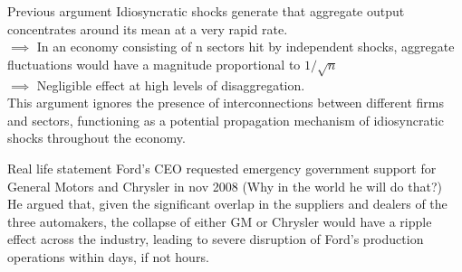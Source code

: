 \documentclass{beamer}
\begin{document}


\begin{frame}{Previous argument}
    \justifying
    Idiosyncratic shocks generate that aggregate output concentrates around its mean at a very rapid rate.\\[5pt]
    $\implies$  In an economy consisting of n sectors hit by independent shocks, aggregate fluctuations 
    would have a magnitude proportional to $1/ \sqrt{n}$\\[5pt]
    $\implies$ Negligible effect at
    high levels of disaggregation.\\[10pt]
    
    This argument ignores the presence of interconnections between
    different firms and sectors, functioning as a potential propagation mechanism
    of idiosyncratic shocks throughout the economy.\\
\end{frame}


\begin{frame}{Real life statement}
    \justifying
    Ford's CEO requested emergency government support for General Motors and
    Chrysler in nov 2008 (Why in the world he will do that?)\\[10pt]
    
    He argued that, given the significant
    overlap in the suppliers and dealers of the three automakers, the collapse of
    either GM or Chrysler would have a ripple effect across the industry, leading
    to severe disruption of Ford’s production operations within days, if not hours.\\
\end{frame}
\end{document}
